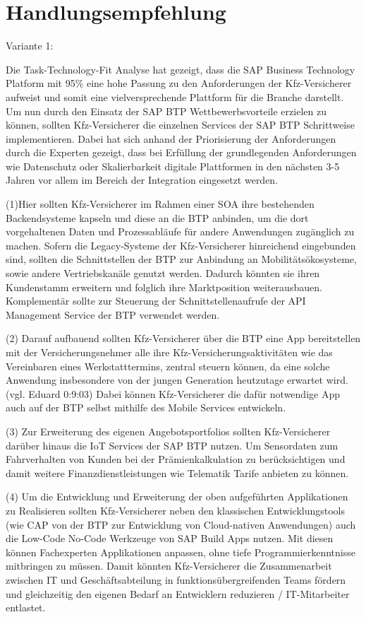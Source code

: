 \chapter{Handlungsempfehlung}

Variante 1:

Die Task-Technology-Fit Analyse hat gezeigt, dass die SAP Business Technology Platform mit 95\% eine hohe Passung zu den Anforderungen der Kfz-Versicherer aufweist und somit eine vielversprechende Plattform für die Branche darstellt. Um nun durch den Einsatz der SAP BTP Wettbewerbsvorteile erzielen zu können, sollten Kfz-Versicherer die einzelnen Services der SAP BTP Schrittweise implementieren. Dabei hat sich anhand der Priorisierung der Anforderungen durch die Experten gezeigt, dass bei Erfüllung der grundlegenden Anforderungen wie Datenschutz oder Skalierbarkeit digitale Plattformen in den nächsten 3-5 Jahren vor allem im Bereich der Integration eingesetzt werden. 

(1)Hier sollten Kfz-Versicherer im Rahmen einer SOA ihre bestehenden Backendsysteme kapseln und diese an die BTP anbinden, um die dort vorgehaltenen Daten und Prozessabläufe für andere Anwendungen zugänglich zu machen. Sofern die Legacy-Systeme der Kfz-Versicherer hinreichend eingebunden sind, sollten die Schnittstellen der BTP zur Anbindung an Mobilitätsökosysteme, sowie andere Vertriebskanäle genutzt werden. Dadurch könnten sie ihren Kundenstamm erweitern und folglich ihre Marktposition weiterausbauen. Komplementär sollte zur Steuerung der Schnittstellenaufrufe der API Management Service der BTP verwendet werden.

(2) Darauf aufbauend sollten Kfz-Versicherer über die BTP eine App bereitstellen mit der Versicherungsnehmer alle ihre Kfz-Versicherungsaktivitäten wie das Vereinbaren eines Werkstatttermins, zentral steuern können, da eine solche Anwendung insbesondere von der jungen Generation heutzutage erwartet wird. (vgl. Eduard 0:9:03)  Dabei können Kfz-Versicherer die dafür notwendige App auch auf der BTP selbst mithilfe des Mobile Services entwickeln.

(3) Zur Erweiterung des eigenen Angebotsportfolios sollten Kfz-Versicherer darüber hinaus die IoT Services der SAP BTP nutzen. Um Sensordaten zum Fahrverhalten von Kunden bei der Prämienkalkulation zu berücksichtigen und damit weitere Finanzdienstleistungen wie Telematik Tarife anbieten zu können.

(4) Um die Entwicklung und Erweiterung der oben aufgeführten Applikationen zu Realisieren sollten Kfz-Versicherer neben den klassischen Entwicklungstools (wie CAP von der BTP zur Entwicklung von Cloud-nativen Anwendungen) auch die Low-Code No-Code Werkzeuge von SAP Build Apps nutzen. Mit diesen können Fachexperten Applikationen anpassen, ohne tiefe Programmierkenntnisse mitbringen zu müssen. Damit könnten Kfz-Versicherer die Zusammenarbeit zwischen IT und Geschäftsabteilung in funktionsübergreifenden Teams fördern und gleichzeitig den eigenen Bedarf an Entwicklern reduzieren / IT-Mitarbeiter entlastet.

